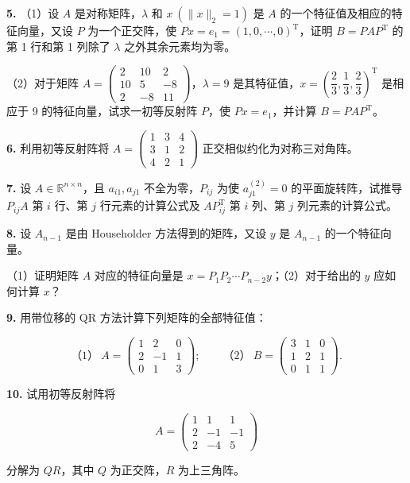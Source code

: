 \documentclass[
  10pt,
  fontset=fandol]{ctexart}
\begin{document}
\textbf{5.} （1）设 \(A\) 是对称矩阵，\(\lambda\) 和 \(x\ (\|x\|_2=1)\) 是 \(A\) 的一个特征值及相应的特征向量，又设 \(P\) 为一个正交阵，使 \(Px=e_1=(1,0,\cdots,0)^{\mathrm T}\)，证明 \(B=PAP^{\mathrm T}\) 的第 1 行和第 1 列除了 \(\lambda\) 之外其余元素均为零。

（2）对于矩阵 \(A=\begin{pmatrix}2&10&2\\10&5&-8\\2&-8&11\end{pmatrix}\)，\(\lambda=9\) 是其特征值，\(x=\left(\dfrac23,\dfrac13,\dfrac23\right)^{\mathrm T}\) 是相应于 9 的特征向量，试求一初等反射阵 \(P\)，使 \(Px=e_1\)，并计算 \(B=PAP^{\mathrm T}\)。

\textbf{6.} 利用初等反射阵将 \(A=\begin{pmatrix}1&3&4\\3&1&2\\4&2&1\end{pmatrix}\) 正交相似约化为对称三对角阵。

\textbf{7.} 设 \(A\in\mathbb R^{n\times n}\)，且 \(a_{i1},a_{j1}\) 不全为零，\(P_{ij}\) 为使 \(a_{j1}^{(2)}=0\) 的平面旋转阵，试推导 \(P_{ij}A\) 第 \(i\) 行、第 \(j\) 行元素的计算公式及 \(AP_{ij}^{\mathrm T}\) 第 \(i\) 列、第 \(j\) 列元素的计算公式。

\textbf{8.} 设 \(A_{n-1}\) 是由 Householder 方法得到的矩阵，又设 \(y\) 是 \(A_{n-1}\) 的一个特征向量。

（1）证明矩阵 \(A\) 对应的特征向量是 \(x=P_1P_2\cdots P_{n-2}y\)；（2）对于给出的 \(y\) 应如何计算 \(x\)？

\textbf{9.} 用带位移的 QR 方法计算下列矩阵的全部特征值：

\[
\text{（1）}\ A=\begin{pmatrix}1&2&0\\2&-1&1\\0&1&3\end{pmatrix};\qquad
\text{（2）}\ B=\begin{pmatrix}3&1&0\\1&2&1\\0&1&1\end{pmatrix}.
\]

\textbf{10.} 试用初等反射阵将

\[
A=\begin{pmatrix}1&1&1\\2&-1&-1\\2&-4&5\end{pmatrix}
\]

分解为 \(QR\)，其中 \(Q\) 为正交阵，\(R\) 为上三角阵。
\end{document}
